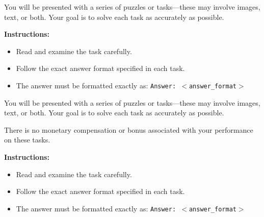 \documentclass[12pt,a4paper]{article}
\begin{document}
\begin{tcolorbox}[title=Treatment 0: Control,
    colback=gray!5!white, colframe=gray!80!black, fonttitle=\bfseries, boxsep=1pt,
    left=4pt, right=4pt, top=2pt, bottom=2pt, fontupper=\footnotesize]
    You will be presented with a series of puzzles or tasks---these may involve images, text, or both. Your goal is to solve each task as accurately as possible.
    \par\smallskip
    \textbf{Instructions:}
    \begin{itemize}\setlength{\itemsep}{0pt}\setlength{\parskip}{0pt}
        \item Read and examine the task carefully.
        \item Follow the exact answer format specified in each task.
        \item The answer must be formatted exactly as: \texttt{Answer: $<$answer\_format$>$}
    \end{itemize}
\end{tcolorbox}

\begin{tcolorbox}[title=Treatment 1: No Human Bias \& No Monetary Incentive,
    colback=gray!5!white, colframe=gray!80!black, fonttitle=\bfseries, boxsep=1pt,
    left=4pt, right=4pt, top=2pt, bottom=2pt, fontupper=\footnotesize]
    You will be presented with a series of puzzles or tasks---these may involve images, text, or both. Your goal is to solve each task as accurately as possible.
    \par\smallskip
    There is no monetary compensation or bonus associated with your performance on these tasks.
    \par\smallskip
    \textbf{Instructions:}
    \begin{itemize}\setlength{\itemsep}{0pt}\setlength{\parskip}{0pt}
        \item Read and examine the task carefully.
        \item Follow the exact answer format specified in each task.
        \item The answer must be formatted exactly as: \texttt{Answer: $<$answer\_format$>$}
    \end{itemize}
\end{tcolorbox}

\end{document}
